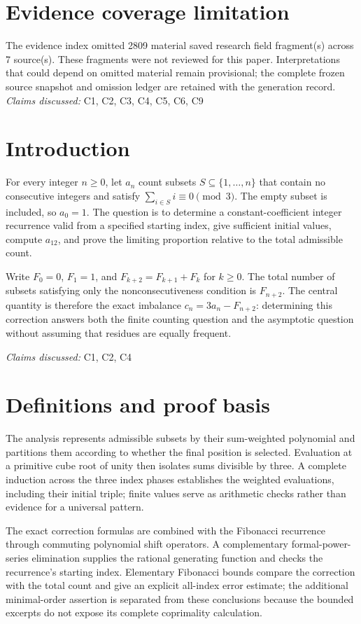 \documentclass[11pt]{article}
\begin{document}
\section*{Evidence coverage limitation}
The evidence index omitted 2809 material saved research field fragment(s) across 7 source(s). These fragments were not reviewed for this paper. Interpretations that could depend on omitted material remain provisional; the complete frozen source snapshot and omission ledger are retained with the generation record.
\textit{Claims discussed: }C1, C2, C3, C4, C5, C6, C9
\section{Introduction}
For every integer $n\geq 0$, let $a_n$ count subsets $S\subseteq\{1,\ldots,n\}$ that contain no consecutive integers and satisfy $\sum_{i\in S}i\equiv 0\pmod 3$. The empty subset is included, so $a_0=1$. The question is to determine a constant-coefficient integer recurrence valid from a specified starting index, give sufficient initial values, compute $a_{12}$, and prove the limiting proportion relative to the total admissible count.

Write $F_0=0$, $F_1=1$, and $F_{k+2}=F_{k+1}+F_k$ for $k\geq 0$. The total number of subsets satisfying only the nonconsecutiveness condition is $F_{n+2}$. The central quantity is therefore the exact imbalance $c_n=3a_n-F_{n+2}$: determining this correction answers both the finite counting question and the asymptotic question without assuming that residues are equally frequent.

\textit{Claims discussed: }C1, C2, C4
\section{Definitions and proof basis}
The analysis represents admissible subsets by their sum-weighted polynomial and partitions them according to whether the final position is selected. Evaluation at a primitive cube root of unity then isolates sums divisible by three. A complete induction across the three index phases establishes the weighted evaluations, including their initial triple; finite values serve as arithmetic checks rather than evidence for a universal pattern.

The exact correction formulas are combined with the Fibonacci recurrence through commuting polynomial shift operators. A complementary formal-power-series elimination supplies the rational generating function and checks the recurrence's starting index. Elementary Fibonacci bounds compare the correction with the total count and give an explicit all-index error estimate; the additional minimal-order assertion is separated from these conclusions because the bounded excerpts do not expose its complete coprimality calculation.
\end{document}
